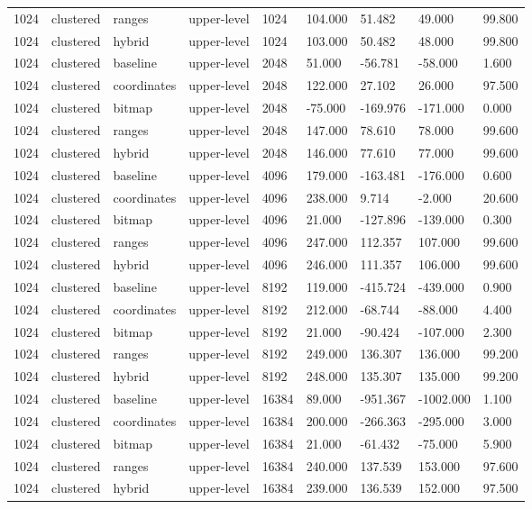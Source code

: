 \begin{tabular}{lllllllll}
1024 & clustered & ranges & upper-level & 1024 & 104.000 & 51.482 & 49.000 & 99.800 \\
1024 & clustered & hybrid & upper-level & 1024 & 103.000 & 50.482 & 48.000 & 99.800 \\
1024 & clustered & baseline & upper-level & 2048 & 51.000 & -56.781 & -58.000 & 1.600 \\
1024 & clustered & coordinates & upper-level & 2048 & 122.000 & 27.102 & 26.000 & 97.500 \\
1024 & clustered & bitmap & upper-level & 2048 & -75.000 & -169.976 & -171.000 & 0.000 \\
1024 & clustered & ranges & upper-level & 2048 & 147.000 & 78.610 & 78.000 & 99.600 \\
1024 & clustered & hybrid & upper-level & 2048 & 146.000 & 77.610 & 77.000 & 99.600 \\
1024 & clustered & baseline & upper-level & 4096 & 179.000 & -163.481 & -176.000 & 0.600 \\
1024 & clustered & coordinates & upper-level & 4096 & 238.000 & 9.714 & -2.000 & 20.600 \\
1024 & clustered & bitmap & upper-level & 4096 & 21.000 & -127.896 & -139.000 & 0.300 \\
1024 & clustered & ranges & upper-level & 4096 & 247.000 & 112.357 & 107.000 & 99.600 \\
1024 & clustered & hybrid & upper-level & 4096 & 246.000 & 111.357 & 106.000 & 99.600 \\
1024 & clustered & baseline & upper-level & 8192 & 119.000 & -415.724 & -439.000 & 0.900 \\
1024 & clustered & coordinates & upper-level & 8192 & 212.000 & -68.744 & -88.000 & 4.400 \\
1024 & clustered & bitmap & upper-level & 8192 & 21.000 & -90.424 & -107.000 & 2.300 \\
1024 & clustered & ranges & upper-level & 8192 & 249.000 & 136.307 & 136.000 & 99.200 \\
1024 & clustered & hybrid & upper-level & 8192 & 248.000 & 135.307 & 135.000 & 99.200 \\
1024 & clustered & baseline & upper-level & 16384 & 89.000 & -951.367 & -1002.000 & 1.100 \\
1024 & clustered & coordinates & upper-level & 16384 & 200.000 & -266.363 & -295.000 & 3.000 \\
1024 & clustered & bitmap & upper-level & 16384 & 21.000 & -61.432 & -75.000 & 5.900 \\
1024 & clustered & ranges & upper-level & 16384 & 240.000 & 137.539 & 153.000 & 97.600 \\
1024 & clustered & hybrid & upper-level & 16384 & 239.000 & 136.539 & 152.000 & 97.500 \\
\end{tabular}
